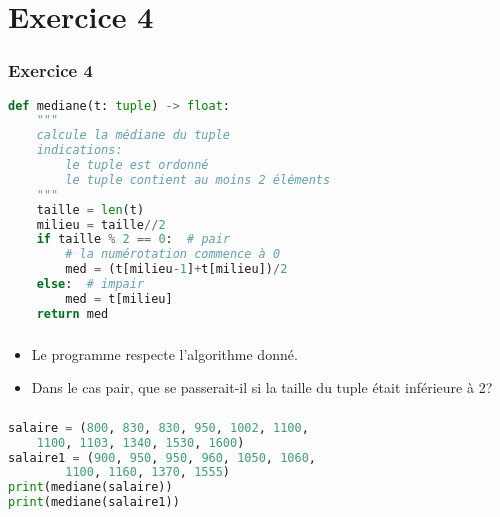 \documentclass[svgnames,11pt]{beamer}
\begin{document}
\section{Exercice 4}
\begin{frame}[fragile]
    \frametitle{Exercice 4}

\begin{lstlisting}[language=Python , basicstyle=\ttfamily\small, xleftmargin=2em, xrightmargin=2em]
def mediane(t: tuple) -> float:
    """
    calcule la médiane du tuple
    indications:
        le tuple est ordonné
        le tuple contient au moins 2 éléments
    """
    taille = len(t)
    milieu = taille//2
    if taille % 2 == 0:  # pair
        # la numérotation commence à 0
        med = (t[milieu-1]+t[milieu])/2
    else:  # impair
        med = t[milieu]
    return med
\end{lstlisting}


\end{frame}
\begin{frame}
    \frametitle{}

    \begin{aretenir}[Observations]
\begin{itemize}
    \item Le programme respecte l'algorithme donné.
    \item Dans le cas pair, que se passerait-il si la taille du tuple était inférieure à 2?
\end{itemize}
    \end{aretenir}

\end{frame}
\begin{frame}[fragile]
    \frametitle{}
    \begin{center}
\begin{lstlisting}[language=Python , basicstyle=\ttfamily\small, xleftmargin=2em, xrightmargin=2em]
salaire = (800, 830, 830, 950, 1002, 1100,
    1100, 1103, 1340, 1530, 1600)
salaire1 = (900, 950, 950, 960, 1050, 1060,
        1100, 1160, 1370, 1555)
print(mediane(salaire))
print(mediane(salaire1))
\end{lstlisting}
        \label{CODE}
        \end{center}
    

\end{frame}
\end{document}
